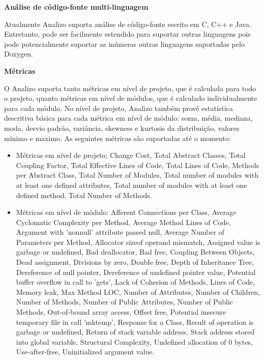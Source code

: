 {\bf Análise de código-fonte multi-linguagem}

Atualmente Analizo suporta análise de código-fonte escrito em C, C++ e Java.
Entretanto, pode ser facilmente estendido para suportar outras linguagens pois
pode potencialmente suportar as inúmeras outras linguagens suportadas pelo Doxygen.

{\bf Métricas}\label{metricas}

O Analizo suporta tanto métricas em nível de projeto, que é calculada para todo o projeto,
quanto métricas em nível de módulos, que é calculado individualmente para cada módulo.
No nível de projeto, Analizo também provê estatística descritiva básica para cada métrica em
nível de módulo: soma, média, mediana, moda, desvio padrão, variância, skewness e kurtosis da
distribuição, valores mínimo e maximo. As seguintes métricas são suportadas até o momento:

\begin{itemize}

  \item Métricas em nível de projeto: Change Cost, Total Abstract Classes,
  Total Coupling Factor, Total Effective Lines of Code, Total Lines of Code,
  Methods per Abstract Class, Total Number of Modules, Total number of modules
  with at least one defined attributes, Total number of modules with at least
  one defined method, Total Number of Methods.

  \item Métricas em nível de módulo: Afferent Connections per Class, Average
  Cyclomatic Complexity per Method, Average Method Lines of Code, Argument with
  'nonnull' attribute passed null, Average Number of Parameters per Method,
  Allocator sizeof operand mismatch, Assigned value is garbage or undefined,
  Bad deallocator, Bad free, Coupling Between Objects, Dead assignment,
  Divisions by zero, Double free, Depth of Inheritance Tree, Dereference of
  null pointer, Dereference of undefined pointer value, Potential buffer
  overflow in call to 'gets', Lack of Cohesion of Methods, Lines of Code,
  Memory leak, Max Method LOC, Number of Attributes, Number of Children, Number
  of Methods, Number of Public Attributes, Number of Public Methods,
  Out-of-bound array access, Offset free, Potential insecure temporary file in
  call 'mktemp', Response for a Class, Result of operation is garbage or
  undefined, Return of stack variable address, Stack address stored into global
  variable, Structural Complexity, Undefined allocation of 0 bytes,
  Use-after-free, Uninitialized argument value.

\end{itemize}


